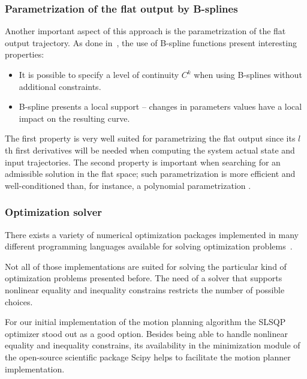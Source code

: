 \documentclass[eprint]{actapoly}
\begin{document}
\subsubsection{Parametrization of the flat output by B-splines}

Another important aspect of this approach is the parametrization of 
the flat output trajectory. As done in~\cite{Milam2003}, the use
of B-spline functions present interesting properties:


\begin{itemize}


 \item It is possible to specify a level of continuity $C^k$ when using
 B-splines without additional constraints.
 
 \item B-spline presents a local support -- changes in parameters values have a 
 local impact on the resulting curve.
 
 
\end{itemize}

The first property is very well suited for parametrizing the flat output since
its $l$th first derivatives will be needed when computing the system actual state
and input trajectories. The second property is important when searching for an
admissible solution in the flat space; such parametrization is more efficient
and well-conditioned than, for instance, a polynomial parametrization \cite{Milam2003}.

\subsubsection{Optimization solver}

There exists a variety of numerical optimization packages implemented in many different programming languages available for solving optimization problems~\cite{pyopt-paper}.

Not all of those implementations are suited for solving
the particular kind of optimization problems presented before.
The need of a solver that supports nonlinear equality and inequality constrains
restricts the number of possible choices.

For our initial implementation of the motion planning algorithm the
SLSQP optimizer stood out
as a good option. Besides being able to handle nonlinear equality and inequality 
constrains, its availability in the minimization module of the open-source
scientific package Scipy helps to facilitate the motion planner implementation.
\end{document}
